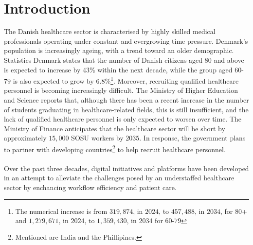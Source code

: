 \section{Introduction}
The Danish healthcare sector is characterised by highly skilled medical professionals operating under constant and evergrowing time pressure.
Denmark's population is increasingly ageing, with a trend toward an older demographic. Statistics Denmark\cite{dst-older-pop} states that the number of Danish citizens aged $80$ and above is expected to increase by $43$\% within the next decade, while the group aged $60$-$79$ is also expected to grow by $6.8$\%\footnote{The numerical increase is from $319,874$, in $2024$, to $457,488$, in $2034$, for $80$+ and $1,279,671$, in $2024$, to $1,359,430$, in $2034$ for $60$-$79$}. Moreover, recruiting qualified healthcare personnel is becoming increasingly difficult. The Ministry of Higher Education and Science\cite{MoHEaS-healthcare-rectruitment} reports that, although there has been a recent increase in the number of students graduating in healthcare-related fields, this is still insufficient, and the lack of qualified healthcare personnel is only expected to worsen over time. The Ministry of Finance\cite{MoHEaS-healthcare-rectruitment} anticipates that the healthcare sector will be short by approximately $15,000$ SOSU workers by $2035$. In response, the government plans to partner with developing countries\footnote{Mentioned are India and the Phillipines.} to help recruit healthcare personnel.
\\
\\
Over the past three decades, digital initiatives and platforms have been developed in an attempt to alleviate the challenges posed by an understaffed healthcare sector by enchancing workflow efficiency and patient care.   

